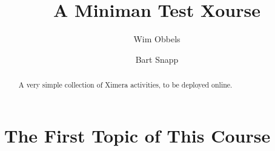 \documentclass{xourse}
\author{Wim Obbels \and Bart Snapp}
\title{A Miniman Test Xourse}
\begin{document}
\begin{abstract}
    A very simple collection of Ximera activities, 
    to be deployed online.
\end{abstract}
\maketitle
\part{The First Topic of This Course}
\chapterstyle
{}
\end{document}
